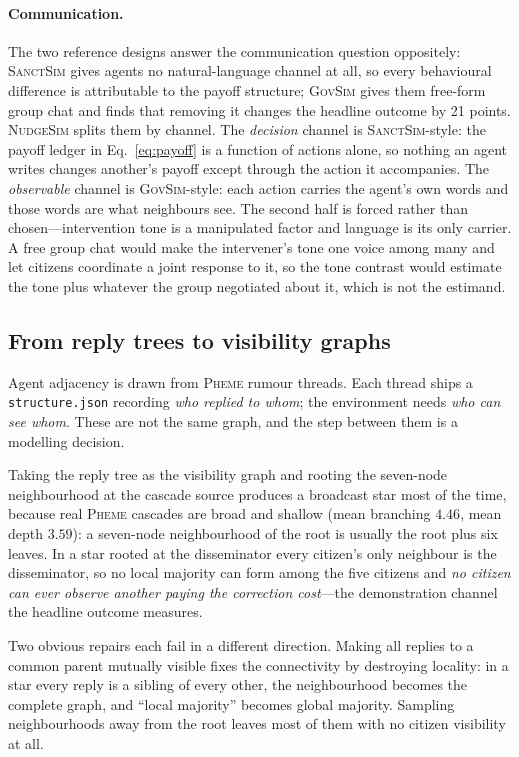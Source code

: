 \documentclass{article}
\begin{document}
\paragraph{Communication.}
The two reference designs answer the communication question oppositely:
\textsc{SanctSim} gives agents no natural-language channel at all, so every
behavioural difference is attributable to the payoff structure; \textsc{GovSim}
gives them free-form group chat and finds that removing it changes the headline
outcome by 21 points. \textsc{NudgeSim} splits them by channel. The
\emph{decision} channel is \textsc{SanctSim}-style: the payoff ledger in
Eq.~\ref{eq:payoff} is a function of actions alone, so nothing an agent writes
changes another's payoff except through the action it accompanies. The
\emph{observable} channel is \textsc{GovSim}-style: each action carries the
agent's own words and those words are what neighbours see. The second half is
forced rather than chosen---intervention tone is a manipulated factor and
language is its only carrier. A free group chat would make the intervener's tone
one voice among many and let citizens coordinate a joint response to it, so the
tone contrast would estimate the tone plus whatever the group negotiated about
it, which is not the estimand.

\subsection{From reply trees to visibility graphs}
\label{sec:visibility}

Agent adjacency is drawn from \textsc{Pheme} rumour threads. Each thread ships a
\texttt{structure.json} recording \emph{who replied to whom}; the environment
needs \emph{who can see whom}. These are not the same graph, and the step
between them is a modelling decision.

Taking the reply tree as the visibility graph and rooting the seven-node
neighbourhood at the cascade source produces a broadcast star most of the time,
because real \textsc{Pheme} cascades are broad and shallow (mean branching
$4.46$, mean depth $3.59$): a seven-node neighbourhood of the root is usually
the root plus six leaves. In a star rooted at the disseminator every citizen's
only neighbour is the disseminator, so no local majority can form among the five
citizens and \emph{no citizen can ever observe another paying the correction
cost}---the demonstration channel the headline outcome measures.

Two obvious repairs each fail in a different direction. Making all replies to a
common parent mutually visible fixes the connectivity by destroying locality: in
a star every reply is a sibling of every other, the neighbourhood becomes the
complete graph, and ``local majority'' becomes global majority. Sampling
neighbourhoods away from the root leaves most of them with no citizen visibility
at all.
\end{document}
